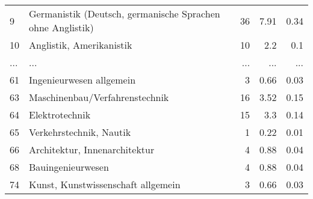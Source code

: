 \begin{longtable}{lXrrr}
        9 & \multicolumn{1}{X}{Germanistik (Deutsch, germanische Sprachen ohne Anglistik)} & %
          \num{36} &
          \num[round-mode=places,round-precision=2]{7,91} &
          \num[round-mode=places,round-precision=2]{0,34} \\
        10 & \multicolumn{1}{X}{Anglistik, Amerikanistik} & %
          \num{10} &
          \num[round-mode=places,round-precision=2]{2,2} &
          \num[round-mode=places,round-precision=2]{0,1} \\
       ... & ... & ... & ... & ... \\
        61 & \multicolumn{1}{X}{Ingenieurwesen allgemein} & %
          \num{3} &
          \num[round-mode=places,round-precision=2]{0,66} &
          \num[round-mode=places,round-precision=2]{0,03} \\

        63 & \multicolumn{1}{X}{Maschinenbau/Verfahrenstechnik} & %
          \num{16} &
          \num[round-mode=places,round-precision=2]{3,52} &
          \num[round-mode=places,round-precision=2]{0,15} \\

        64 & \multicolumn{1}{X}{Elektrotechnik} & %
          \num{15} &
          \num[round-mode=places,round-precision=2]{3,3} &
          \num[round-mode=places,round-precision=2]{0,14} \\

        65 & \multicolumn{1}{X}{Verkehrstechnik, Nautik} & %
          \num{1} &
          \num[round-mode=places,round-precision=2]{0,22} &
          \num[round-mode=places,round-precision=2]{0,01} \\

        66 & \multicolumn{1}{X}{Architektur, Innenarchitektur} & %
          \num{4} &
          \num[round-mode=places,round-precision=2]{0,88} &
          \num[round-mode=places,round-precision=2]{0,04} \\

        68 & \multicolumn{1}{X}{Bauingenieurwesen} & %
          \num{4} &
          \num[round-mode=places,round-precision=2]{0,88} &
          \num[round-mode=places,round-precision=2]{0,04} \\

        74 & \multicolumn{1}{X}{Kunst, Kunstwissenschaft allgemein} & %
          \num{3} &
          \num[round-mode=places,round-precision=2]{0,66} &
          \num[round-mode=places,round-precision=2]{0,03} \\


\end{longtable}
